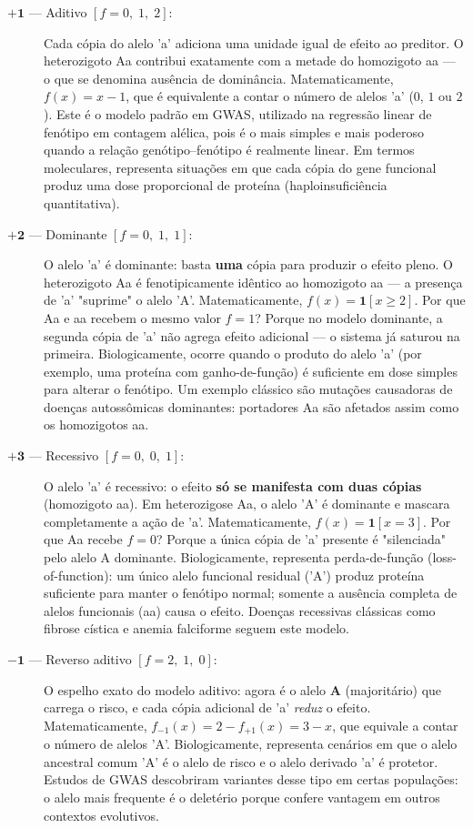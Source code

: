 \documentclass[
    12pt,
    a4paper,
    oneside,
    english,
    french,
    spanish,
    brazil
    ]{abntex2}
\newcommand{\novo}[1]{\textcolor{corNova}{#1}}
\begin{document}
\begin{description}

  \item[\novo{$\boldsymbol{+1}$ --- Aditivo $[f = 0,\;1,\;2]$:}]
  \novo{Cada cópia do alelo 'a' adiciona uma unidade igual de efeito ao preditor. O heterozigoto Aa contribui exatamente com a metade do homozigoto aa --- o que se denomina ausência de dominância. Matematicamente, $f(x) = x - 1$, que é equivalente a contar o número de alelos 'a' ($0$, $1$ ou $2$). Este é o modelo padrão em GWAS, utilizado na regressão linear de fenótipo em contagem alélica, pois é o mais simples e mais poderoso quando a relação genótipo--fenótipo é realmente linear. Em termos moleculares, representa situações em que cada cópia do gene funcional produz uma dose proporcional de proteína (haploinsuficiência quantitativa).}

  \item[\novo{$\boldsymbol{+2}$ --- Dominante $[f = 0,\;1,\;1]$:}]
  \novo{O alelo 'a' é dominante: basta \textbf{uma} cópia para produzir o efeito pleno. O heterozigoto Aa é fenotipicamente idêntico ao homozigoto aa --- a presença de 'a' "suprime" o alelo 'A'. Matematicamente, $f(x) = \mathbf{1}[x \geq 2]$. Por que Aa e aa recebem o mesmo valor $f = 1$? Porque no modelo dominante, a segunda cópia de 'a' não agrega efeito adicional --- o sistema já saturou na primeira. Biologicamente, ocorre quando o produto do alelo 'a' (por exemplo, uma proteína com ganho-de-função) é suficiente em dose simples para alterar o fenótipo. Um exemplo clássico são mutações causadoras de doenças autossômicas dominantes: portadores Aa são afetados assim como os homozigotos aa.}

  \item[\novo{$\boldsymbol{+3}$ --- Recessivo $[f = 0,\;0,\;1]$:}]
  \novo{O alelo 'a' é recessivo: o efeito \textbf{só se manifesta com duas cópias} (homozigoto aa). Em heterozigose Aa, o alelo 'A' é dominante e mascara completamente a ação de 'a'. Matematicamente, $f(x) = \mathbf{1}[x = 3]$. Por que Aa recebe $f = 0$? Porque a única cópia de 'a' presente é "silenciada" pelo alelo A dominante. Biologicamente, representa perda-de-função (loss-of-function): um único alelo funcional residual ('A') produz proteína suficiente para manter o fenótipo normal; somente a ausência completa de alelos funcionais (aa) causa o efeito. Doenças recessivas clássicas como fibrose cística e anemia falciforme seguem este modelo.}

  \item[\novo{$\boldsymbol{-1}$ --- Reverso aditivo $[f = 2,\;1,\;0]$:}]
  \novo{O espelho exato do modelo aditivo: agora é o alelo \textbf{A} (majoritário) que carrega o risco, e cada cópia adicional de 'a' \textit{reduz} o efeito. Matematicamente, $f_{-1}(x) = 2 - f_{+1}(x) = 3 - x$, que equivale a contar o número de alelos 'A'. Biologicamente, representa cenários em que o alelo ancestral comum 'A' é o alelo de risco e o alelo derivado 'a' é protetor. Estudos de GWAS descobriram variantes desse tipo em certas populações: o alelo mais frequente é o deletério porque confere vantagem em outros contextos evolutivos.}


\end{description}
\end{document}
